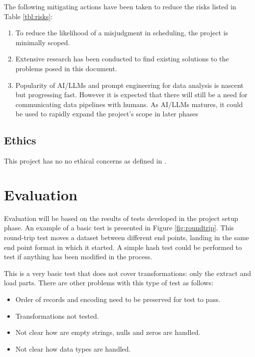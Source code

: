The following mitigating actions have been taken to reduce the risks
listed in Table \ref{tbl:risks}:

\begin{enumerate}
\def\labelenumi{\arabic{enumi}.}
\tightlist
\item
  To reduce the likelihood of a misjudgment in scheduling, the project
  is minimally scoped.
\item
  Extensive research has been conducted to find existing solutions to
  the problems posed in this document.
\item
  Popularity of AI/LLMs and prompt engineering for data analysis is
  nascent but progressing fast. However it is expected that there will
  still be a need for communicating data pipelines with humans. As
  AI/LLMs matures, it could be used to rapidly expand the project's
  scope in later phases
\end{enumerate}

\subsection{Ethics}\label{ethics}

This project has no no ethical concerns as defined in \citep{ethics}.

\section{Evaluation}\label{evaluation}

Evaluation will be based on the results of tests developed in the
project setup phase. An example of a basic test is presented in Figure
\ref{fig:roundtrip}. This round-trip test moves a dataset between
different end points, landing in the same end point format in which it
started. A simple hash test could be performed to test if anything has
been modified in the process.



This is a very basic test that does not cover transformations: only the
extract and load parts. There are other problems with this type of test
as follows:

\begin{itemize}
\tightlist
\item
  Order of records and encoding need to be preserved for test to pass.
\item
  Transformations not tested.
\item
  Not clear how are empty strings, nulls and zeros are handled.
\item
  Not clear how data types are handled.
\end{itemize}

